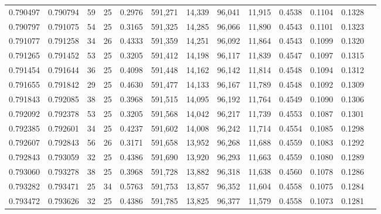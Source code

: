 \begin{tabular}{rrrrrrrrrrrrr}
0.790497 & 0.790794 &    59 &  25 &                                     0.2976 & 591,271 &  14,339 &  96,041 &  11,915 & 0.4538 & 0.1104 & 0.1328 \\
0.790797 & 0.791075 &    54 &  25 &                                     0.3165 & 591,325 &  14,285 &  96,066 &  11,890 & 0.4543 & 0.1101 & 0.1323 \\
0.791077 & 0.791258 &    34 &  26 &                                     0.4333 & 591,359 &  14,251 &  96,092 &  11,864 & 0.4543 & 0.1099 & 0.1320 \\
0.791265 & 0.791452 &    53 &  25 &                                     0.3205 & 591,412 &  14,198 &  96,117 &  11,839 & 0.4547 & 0.1097 & 0.1315 \\
0.791454 & 0.791644 &    36 &  25 &                                     0.4098 & 591,448 &  14,162 &  96,142 &  11,814 & 0.4548 & 0.1094 & 0.1312 \\
0.791655 & 0.791842 &    29 &  25 &                                     0.4630 & 591,477 &  14,133 &  96,167 &  11,789 & 0.4548 & 0.1092 & 0.1309 \\
0.791843 & 0.792085 &    38 &  25 &                                     0.3968 & 591,515 &  14,095 &  96,192 &  11,764 & 0.4549 & 0.1090 & 0.1306 \\
0.792092 & 0.792378 &    53 &  25 &                                     0.3205 & 591,568 &  14,042 &  96,217 &  11,739 & 0.4553 & 0.1087 & 0.1301 \\
0.792385 & 0.792601 &    34 &  25 &                                     0.4237 & 591,602 &  14,008 &  96,242 &  11,714 & 0.4554 & 0.1085 & 0.1298 \\
0.792607 & 0.792843 &    56 &  26 &                                     0.3171 & 591,658 &  13,952 &  96,268 &  11,688 & 0.4559 & 0.1083 & 0.1292 \\
0.792843 & 0.793059 &    32 &  25 &                                     0.4386 & 591,690 &  13,920 &  96,293 &  11,663 & 0.4559 & 0.1080 & 0.1289 \\
0.793060 & 0.793278 &    38 &  25 &                                     0.3968 & 591,728 &  13,882 &  96,318 &  11,638 & 0.4560 & 0.1078 & 0.1286 \\
0.793282 & 0.793471 &    25 &  34 &                                     0.5763 & 591,753 &  13,857 &  96,352 &  11,604 & 0.4558 & 0.1075 & 0.1284 \\
0.793472 & 0.793626 &    32 &  25 &                                     0.4386 & 591,785 &  13,825 &  96,377 &  11,579 & 0.4558 & 0.1073 & 0.1281 \\

\end{tabular}
